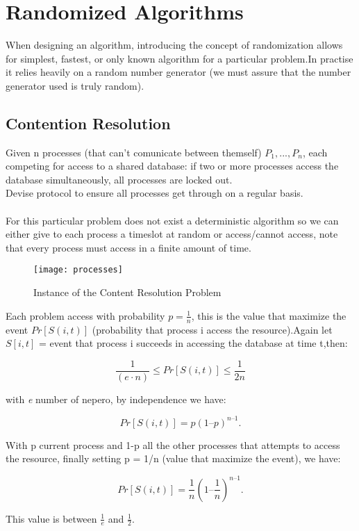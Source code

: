 \section{Randomized Algorithms}
When designing an algorithm, introducing the concept of randomization allows for simplest, fastest, or only known algorithm for a particular problem.In practise it relies heavily on a random number generator (we must assure that the number generator used is truly random).

\subsection{Contention Resolution}

Given n processes (that can't comunicate between themself) $P_{1}, ..., P_{n}$, each competing for access to a shared database: if two or more processes access the database simultaneously, all processes are locked out.\\ Devise protocol to ensure all processes get through on a regular basis.\\\\
For this particular problem does not exist a deterministic algorithm so we can either give to each process a timeslot at random or access/cannot access, note that every process must access in a finite amount of time.

\begin{figure}[H]
    \centering
    \texttt{[image: processes]}
    \caption{Instance of the Content Resolution Problem}
\end{figure}

Each problem access with probability $p=\frac{1}{n}$, this is the value that maximize the event $Pr[S(i, t)]$ (probability that process i access the resource).Again let $S[i, t]$ = event that process i succeeds in accessing the database at time t,then:

\[ \frac{1}{(e⋅n)} \leq Pr [S(i, t)] \leq \frac{1}{2n} \]

with \emph{e} number of nepero, by independence we have:

\[Pr [S(i, t)] = p(1 – p)^ {n – 1}.\]

With p current process and 1-p all the other processes that attempts to access the resource, finally setting p = 1/n (value that maximize the event), we have:

\[Pr [S(i, t)] = \frac{1}{n}(1 – \frac{1}{n})^ {n – 1}.\]

This value is between $\frac{1}{e}$ and $\frac{1}{2}$.\\

